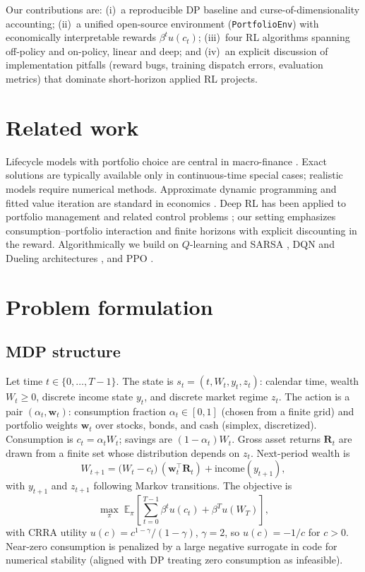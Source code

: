 \documentclass[11pt,a4paper]{article}
\begin{document}
Our contributions are: (i)~a reproducible DP baseline and curse-of-dimensionality accounting; (ii)~a unified open-source environment (\texttt{PortfolioEnv}) with economically interpretable rewards $\beta^t u(c_t)$; (iii)~four RL algorithms spanning off-policy and on-policy, linear and deep; and (iv)~an explicit discussion of implementation pitfalls (reward bugs, training dispatch errors, evaluation metrics) that dominate short-horizon applied RL projects.

\section{Related work}

Lifecycle models with portfolio choice are central in macro-finance \citep{samuelson1969lifetime,merton1969lifetime}. Exact solutions are typically available only in continuous-time special cases; realistic models require numerical methods. Approximate dynamic programming and fitted value iteration are standard in economics \citep{judd1998numerical}. Deep RL has been applied to portfolio management and related control problems \citep{jiang2017cryptocurrency}; our setting emphasizes consumption--portfolio interaction and finite horizons with explicit discounting in the reward. Algorithmically we build on $Q$-learning and SARSA \citep{sutton2018reinforcement}, DQN and Dueling architectures \citep{mnih2015human,wang2016dueling}, and PPO \citep{schulman2017proximal}.

\section{Problem formulation}

\subsection{MDP structure}

Let time $t \in \{0,\ldots,T-1\}$. The state is $s_t = (t, W_t, y_t, z_t)$: calendar time, wealth $W_t \ge 0$, discrete income state $y_t$, and discrete market regime $z_t$. The action is a pair $(\alpha_t, \mathbf{w}_t)$: consumption fraction $\alpha_t \in [0,1]$ (chosen from a finite grid) and portfolio weights $\mathbf{w}_t$ over stocks, bonds, and cash (simplex, discretized). Consumption is $c_t = \alpha_t W_t$; savings are $(1-\alpha_t)W_t$. Gross asset returns $\mathbf{R}_t$ are drawn from a finite set whose distribution depends on $z_t$. Next-period wealth is
\begin{equation}
  W_{t+1} = \bigl(W_t - c_t\bigr)\, (\mathbf{w}_t^\top \mathbf{R}_t) + \text{income}(y_{t+1}),
\end{equation}
with $y_{t+1}$ and $z_{t+1}$ following Markov transitions. The objective is
\begin{equation}
  \max_\pi \; \mathbb{E}_\pi \left[ \sum_{t=0}^{T-1} \beta^t u(c_t) + \beta^T u(W_T) \right],
\end{equation}
with CRRA utility $u(c) = c^{1-\gamma}/(1-\gamma)$, $\gamma = 2$, so $u(c) = -1/c$ for $c>0$. Near-zero consumption is penalized by a large negative surrogate in code for numerical stability (aligned with DP treating zero consumption as infeasible).
\end{document}
